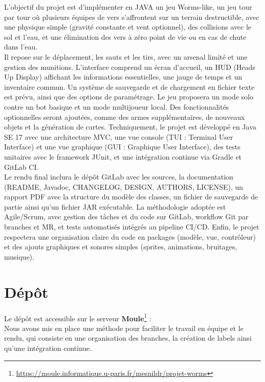 \documentclass[a4paper, 12pt]{article}
\begin{document}
        L’objectif du projet est d'implémenter en JAVA un jeu Worms-like, un jeu tour par tour où plusieurs équipes de vers s’affrontent sur un terrain destructible, avec une physique simple (gravité constante et vent optionnel), des collisions avec le sol et l’eau, et une élimination des vers à zéro point de vie ou en cas de chute dans l’eau.\\
        Il repose sur le déplacement, les sauts et les tirs, avec un arsenal limité et une gestion des munitions.
        L’interface comprend un écran d’accueil, un HUD (Heads Up Display) affichant les informations essentielles, une jauge de temps et un inventaire commun.
        Un système de sauvegarde et de chargement en fichier texte est prévu, ainsi que des options de paramétrage.
        Le jeu proposera un mode solo contre un bot basique et un mode multijoueur local.
        Des fonctionnalités optionnelles seront ajoutées, comme des armes supplémentaires, de nouveaux objets et la génération de cartes.
        Techniquement, le projet est développé en Java SE 17 avec une architecture MVC, une vue console (TUI : Terminal User Interface) et une vue graphique (GUI : Graphique User Interface), des tests unitaires avec le framework JUnit, et une intégration continue via Gradle et GitLab CI.\\
        Le rendu final inclura le dépôt GitLab avec les sources, la documentation (README, Javadoc, CHANGELOG, DESIGN, AUTHORS, LICENSE), un rapport PDF avec la structure du modèle des classes, un fichier de sauvegarde de partie ainsi qu'un fichier JAR exécutable.
        La méthodologie adoptée est Agile/Scrum, avec gestion des tâches et du code sur GitLab, workflow Git par branches et MR, et tests automatisés intégrés au pipeline CI/CD.
        Enfin, le projet respectera une organisation claire du code en packages (modèle, vue, contrôleur) et des ajouts graphiques et sonores simples (sprites, animations, bruitages, musique).


    \section{Dépôt}

        Le dépôt est accessible sur le serveur \textbf{Moule}\footnote{\href{https://moule.informatique.u-paris.fr/mesnildr/projet-worms}{https://moule.informatique.u-paris.fr/mesnildr/projet-worms}} :\\

        Nous avons mis en place une méthode pour faciliter le travail en équipe et le rendu, qui consiste en une organisation des branches, la création de labels ainsi qu'une intégration continue.
\end{document}
